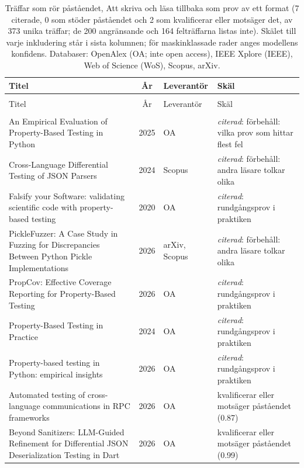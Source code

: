 
\begingroup\footnotesize
\begin{longtable}{@{}%
  >{\raggedright\arraybackslash}p{}c%
  >{\raggedright\arraybackslash}p{}%
  >{\raggedright\arraybackslash}p{}@{}}
\caption{Träffar som rör påståendet, Att skriva och läsa tillbaka som prov av ett format (7 citerade, 0 som stöder påståendet och 2 som kvalificerar eller motsäger det, av 373 unika träffar; de 200 angränsande och 164 felträffarna listas inte). Skälet till varje inkludering står i sista kolumnen; för maskinklassade rader anges modellens konfidens. Databaser: OpenAlex (OA; inte open access), IEEE Xplore (IEEE), Web of Science (WoS), Scopus, arXiv.}\label{tab:sok-rundgang}\\
\toprule
Titel & År & Leverantör & Skäl \\
\midrule
\endfirsthead
\multicolumn{4}{@{}l}{\emph{\tablename~\thetable{} (forts.)}}\\
\toprule
Titel & År & Leverantör & Skäl \\
\midrule
\endhead
\midrule \multicolumn{4}{r@{}}{\emph{forts.\ på nästa sida}}\\
\endfoot
\bottomrule
\endlastfoot
An Empirical Evaluation of Property-Based Testing in Python & 2025 & OA & \emph{citerad}: förbehåll: vilka prov som hittar flest fel \\
Cross-Language Differential Testing of JSON Parsers & 2024 & Scopus & \emph{citerad}: förbehåll: andra läsare tolkar olika \\
Falsify your Software: validating scientific code with property-based testing & 2020 & OA & \emph{citerad}: rundgångsprov i praktiken \\
PickleFuzzer: A Case Study in Fuzzing for Discrepancies Between Python Pickle Implementations & 2026 & arXiv, Scopus & \emph{citerad}: förbehåll: andra läsare tolkar olika \\
PropCov: Effective Coverage Reporting for Property-Based Testing & 2026 & OA & \emph{citerad}: rundgångsprov i praktiken \\
Property-Based Testing in Practice & 2024 & OA & \emph{citerad}: rundgångsprov i praktiken \\
Property-based testing in Python: empirical insights & 2026 & OA & \emph{citerad}: rundgångsprov i praktiken \\
Automated testing of cross-language communications in RPC frameworks & 2026 & OA & kvalificerar eller motsäger påståendet (0.87) \\
Beyond Sanitizers: LLM-Guided Refinement for Differential JSON Deserialization Testing in Dart & 2026 & OA & kvalificerar eller motsäger påståendet (0.99) \\
\end{longtable}
\endgroup
